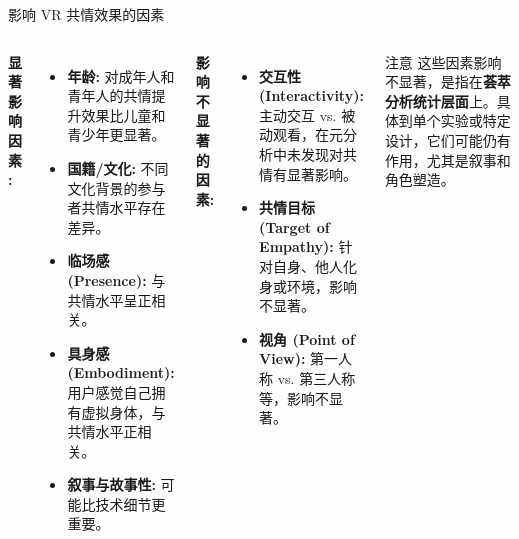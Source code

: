 \documentclass[aspectratio=169,xcolor=dvipsnames]{beamer}
\begin{document}
\begin{frame}{影响 VR 共情效果的因素}
    \begin{columns}[t]
            \textbf{显著影响因素 \cite{lee2024measurement}:}
             \begin{itemize}
                \item \textbf{年龄:} 对成年人和青年人的共情提升效果比儿童和青少年更显著。
                \item \textbf{国籍/文化:} 不同文化背景的参与者共情水平存在差异。
                \item \textbf{临场感 (Presence):} 与共情水平呈正相关。
                \item \textbf{具身感 (Embodiment):} 用户感觉自己拥有虚拟身体，与共情水平正相关。
                \item \textbf{叙事与故事性:} 可能比技术细节更重要。
            \end{itemize}

             \textbf{影响不显著的因素:}
             \begin{itemize}
                \item \textbf{交互性 (Interactivity):} 主动交互 vs. 被动观看，在元分析中未发现对共情有显著影响。
                \item \textbf{共情目标 (Target of Empathy):} 针对自身、他人化身或环境，影响不显著。
                \item \textbf{视角 (Point of View):} 第一人称 vs. 第三人称等，影响不显著。
             \end{itemize}
            \begin{alertblock}{注意}
            这些因素影响不显著，是指在\textbf{荟萃分析统计层面}上。具体到单个实验或特定设计，它们可能仍有作用，尤其是叙事和角色塑造。
            \end{alertblock}
    \end{columns}
\end{frame}
\end{document}
